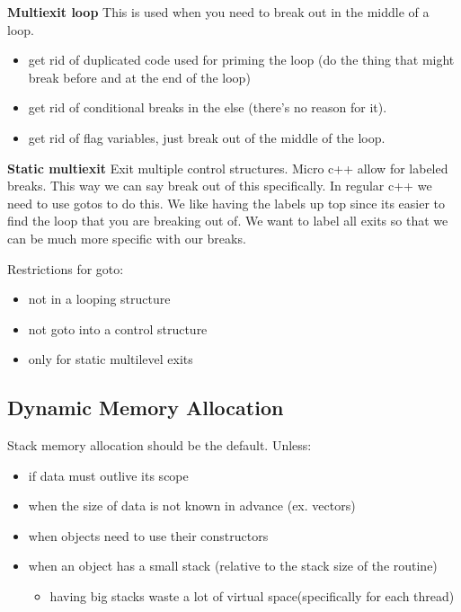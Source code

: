\documentclass{article}
\begin{document}

\textbf{Multiexit loop}
This is used when you need to break out in the middle of a loop.

\begin{itemize}
    \item get rid of duplicated code used for priming the loop (do the thing that might break before and at the end of the loop)
    \item get rid of conditional breaks in the else (there's no reason for it).
    \item get rid of flag variables, just break out of the middle of the loop.
\end{itemize}


\textbf{Static multiexit}
Exit multiple control structures. Micro c++ allow for labeled breaks. This way we can say break out of this specifically. In regular c++ we need to use gotos to do this. We like having the labels up top since its easier to find the loop that you are breaking out of. We want to label all exits so that we can be much more specific with our breaks.

Restrictions for goto:
\begin{itemize}
    \item not in a looping structure
    \item not goto into a control structure
    \item only for static multilevel exits
\end{itemize}

\subsection{Dynamic Memory Allocation}
Stack memory allocation should be the default. Unless:
\begin{itemize}
    \item if data must outlive its scope
    \item when the size of data is not known in advance (ex. vectors)
    \item when objects need to use their constructors
    \item when an object has a small stack (relative to the stack size of the routine)
    \begin{itemize}
        \item having big stacks waste a lot of virtual space(specifically for each thread)
    \end{itemize}
\end{itemize}
\end{document}
